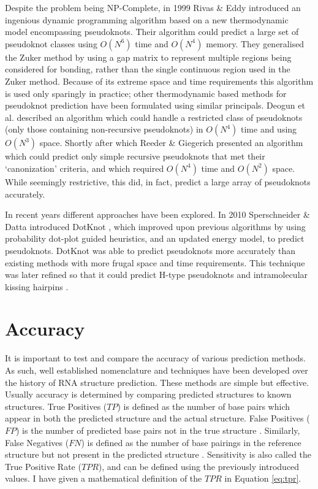\documentclass{cshonours}
\begin{document}
Despite the problem being NP-Complete, in 1999 Rivas \& Eddy \cite{rivas1999dynamic} introduced an ingenious dynamic
programming algorithm based on a new thermodynamic model encompassing pseudoknots. Their algorithm could predict a large set of pseudoknot classes using
$O(N^6)$ time and $O(N^4)$ memory. They generalised the Zuker method by using a gap matrix to represent multiple regions being considered for bonding, rather than
the single continuous region used in the Zuker method. Because of its extreme
space and time requirements this algorithm is used only sparingly in practice; other thermodynamic based methods for pseudoknot prediction have
been formulated using similar principals. Deogun et al. \cite{deogun2004rna} described an algorithm which could handle a restricted class of pseudoknots (only those containing
non-recursive pseudoknots) in $O(N^4)$ time and using $O(N^3)$ space. Shortly after which Reeder \& Giegerich \cite{reeder2004design} presented an algorithm which could predict
only simple recursive pseudoknots that met their `canonization' criteria, and which required $O(N^4)$ time and $O(N^2)$ space. While
seemingly restrictive, this did, in fact, predict a large array of pseudoknots accurately. 

In recent years different approaches have been explored. In 2010 Sperschneider \& Datta introduced DotKnot \cite{sperschneider2010dotknot}, which improved upon previous algorithms by using probability dot-plot guided heuristics, and an updated energy model, to predict pseudoknots. DotKnot was able to predict pseudoknots more accurately than existing methods with more frugal space and time requirements. This technique was later refined so that it could predict H-type pseudoknots and intramolecular kissing hairpins \cite{sperschneider2011heuristic}.


\section{Accuracy}
\label{sec:accuracy}
It is important to test and compare the accuracy of various prediction methods.
As such, well established nomenclature and techniques have been developed over
the history of RNA structure prediction. These methods are simple but effective. Usually accuracy is determined by comparing predicted structures to known
structures. True Positives ($TP$) is defined as the number of base pairs which appear in both the predicted structure and the actual structure. False Positives
($FP$) is the number of predicted base pairs not in the true
structure \cite{lorenz2011viennarna}. Similarly, False Negatives ($FN$) is defined as the number of base
pairings in the reference structure but not present in the predicted structure \cite{lorenz2011viennarna}.
Sensitivity is also called the True Positive Rate ($TPR$), and can be defined using the previously introduced values. I have given a mathematical definition of the $TPR$ in Equation \ref{eq:tpr}.
\end{document}
